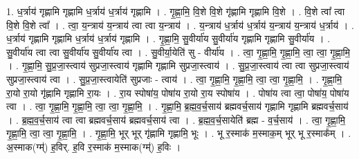 \documentclass[17pt]{extarticle}
\begin{document}
1. ध॒र्त्राय॑ गृह्णामि गृह्णामि ध॒र्त्राय॑ ध॒र्त्राय॑ गृह्णामि । . गृ॒ह्णा॒मि॒ वि॒शे वि॒शे गृ॑ह्णामि गृह्णामि वि॒शे । . वि॒शे त्वा᳚ त्वा वि॒शे वि॒शे त्वा᳚ । . त्वा॒ य॒न्त्राय॑ य॒न्त्राय॑ त्वा त्वा य॒न्त्राय॑ । . य॒न्त्राय॑ ध॒र्त्राय॑ ध॒र्त्राय॑ य॒न्त्राय॑ य॒न्त्राय॑ ध॒र्त्राय॑ । . ध॒र्त्राय॑ गृह्णामि गृह्णामि ध॒र्त्राय॑ ध॒र्त्राय॑ गृह्णामि । . गृ॒ह्णा॒मि॒ सु॒वीर्या॑य सु॒वीर्या॑य गृह्णामि गृह्णामि सु॒वीर्या॑य । . सु॒वीर्या॑य त्वा त्वा सु॒वीर्या॑य सु॒वीर्या॑य त्वा । . सु॒वीर्या॒येति॑ सु - वीर्या॑य । . त्वा॒ गृ॒ह्णा॒मि॒ गृ॒ह्णा॒मि॒ त्वा॒ त्वा॒ गृ॒ह्णा॒मि॒ । . गृ॒ह्णा॒मि॒ सु॒प्र॒जा॒स्त्वाय॑ सुप्रजा॒स्त्वाय॑ गृह्णामि गृह्णामि सुप्रजा॒स्त्वाय॑ । . सु॒प्र॒जा॒स्त्वाय॑ त्वा त्वा सुप्रजा॒स्त्वाय॑ सुप्रजा॒स्त्वाय॑ त्वा । . सु॒प्र॒जा॒स्त्वायेति॑ सुप्रजाः - त्वाय॑ । . त्वा॒ गृ॒ह्णा॒मि॒ गृ॒ह्णा॒मि॒ त्वा॒ त्वा॒ गृ॒ह्णा॒मि॒ । . गृ॒ह्णा॒मि॒ रा॒यो रा॒यो गृ॑ह्णामि गृह्णामि रा॒यः । . रा॒य स्पोषा॑य॒ पोषा॑य रा॒यो रा॒य स्पोषा॑य । . पोषा॑य त्वा त्वा॒ पोषा॑य॒ पोषा॑य त्वा । . त्वा॒ गृ॒ह्णा॒मि॒ गृ॒ह्णा॒मि॒ त्वा॒ त्वा॒ गृ॒ह्णा॒मि॒ । . गृ॒ह्णा॒मि॒ ब्र॒ह्म॒व॒र्च॒साय॑ ब्रह्मवर्च॒साय॑ गृह्णामि गृह्णामि ब्रह्मवर्च॒साय॑ । . ब्र॒ह्म॒व॒र्च॒साय॑ त्वा त्वा ब्रह्मवर्च॒साय॑ ब्रह्मवर्च॒साय॑ त्वा । . ब्र॒ह्म॒व॒र्च॒सायेति॑ ब्रह्म - व॒र्च॒साय॑ । . त्वा॒ गृ॒ह्णा॒मि॒ गृ॒ह्णा॒मि॒ त्वा॒ त्वा॒ गृ॒ह्णा॒मि॒ । . गृ॒ह्णा॒मि॒ भूर् भूर् गृ॑ह्णामि गृह्णामि॒ भूः । . भू र॒स्माक॑ म॒स्माक॒म् भूर् भू र॒स्माक᳚म् । . अ॒स्माक(ग्म्॑) ह॒विर्. ह॒वि र॒स्माक॑ म॒स्माक(ग्म्॑) ह॒विः । \newline
\end{document}
